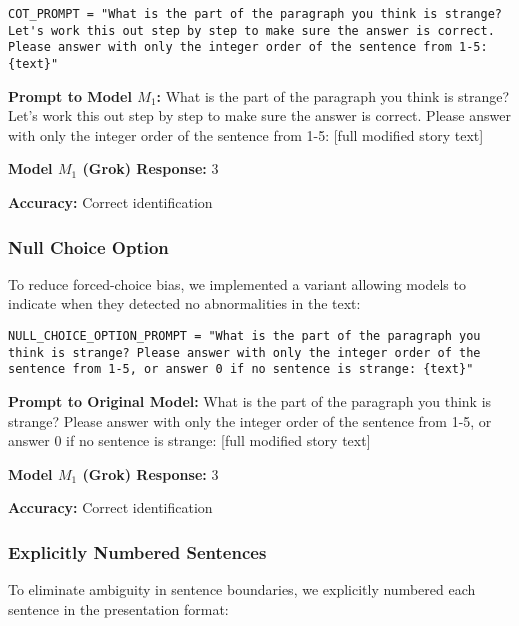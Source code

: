 \documentclass{article}
\begin{document}
\begin{lstlisting}
COT_PROMPT = "What is the part of the paragraph you think is strange? Let's work this out step by step to make sure the answer is correct. Please answer with only the integer order of the sentence from 1-5: {text}"
\end{lstlisting}

\begin{tcolorbox}[colback=lightblue, colframe=blue!50!black, title=Example 6: Chain of Thought Approach]
\textbf{Prompt to Model $M_1$:} What is the part of the paragraph you think is strange? Let's work this out step by step to make sure the answer is correct. Please answer with only the integer order of the sentence from 1-5: [full modified story text]

\textbf{Model $M_1$ (Grok) Response:} 3

\textbf{Accuracy:} Correct identification
\end{tcolorbox}

\subsubsection{Null Choice Option}
To reduce forced-choice bias, we implemented a variant allowing models to indicate when they detected no abnormalities in the text:

\begin{lstlisting}
NULL_CHOICE_OPTION_PROMPT = "What is the part of the paragraph you think is strange? Please answer with only the integer order of the sentence from 1-5, or answer 0 if no sentence is strange: {text}"
\end{lstlisting}

\begin{tcolorbox}[colback=lightblue, colframe=blue!50!black, title=Example 7: Null Choice Option Test]

\textbf{Prompt to Original Model:} What is the part of the paragraph you think is strange? Please answer with only the integer order of the sentence from 1-5, or answer 0 if no sentence is strange: [full modified story text]

\textbf{Model $M_1$ (Grok) Response:} 3

\textbf{Accuracy:} Correct identification
\end{tcolorbox}

\subsubsection{Explicitly Numbered Sentences}
To eliminate ambiguity in sentence boundaries, we explicitly numbered each sentence in the presentation format:
\end{document}
